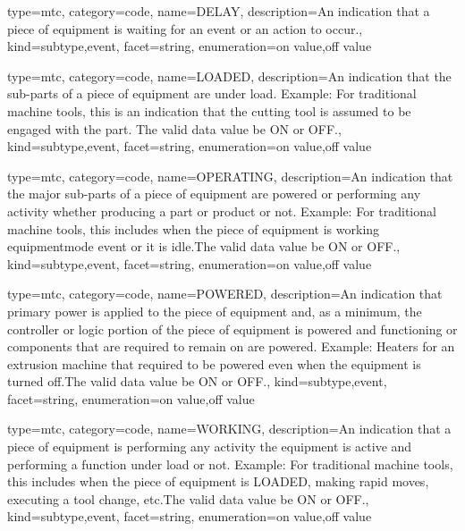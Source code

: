 {
  type=mtc,
  category=code,
  name={DELAY},
  description={An indication that a piece of equipment is waiting for an event or an action to occur.},
  kind={subtype,event},
  facet={\gls{string}},
  enumeration={\gls{on value},\gls{off value}}
}


{
  type=mtc,
  category=code,
  name={LOADED},
  description={An indication that the sub-parts of a piece of equipment are under load. \newline Example: For traditional machine tools, this is an indication that the cutting tool is assumed to be engaged with the part. The \gls{valid data value} \must be ON or OFF.},
  kind={subtype,event},
  facet={\gls{string}},
  enumeration={\gls{on value},\gls{off value}}
}


{
  type=mtc,
  category=code,
  name={OPERATING},
  description={An indication that the major sub-parts of a piece of equipment are powered or performing any activity whether producing a part or product or not.   \newline Example: For traditional machine tools, this includes when the piece of equipment is \gls{working equipmentmode event} or it is idle.The \gls{valid data value} \must be ON or OFF.},
  kind={subtype,event},
  facet={\gls{string}},
  enumeration={\gls{on value},\gls{off value}}
}


{
  type=mtc,
  category=code,
  name={POWERED},
  description={An indication that primary power is applied to the piece of equipment and, as a minimum, the controller or logic portion of the piece of equipment is powered and functioning or components that are required to remain on are powered. Example: Heaters for an extrusion machine that required to be powered even when the equipment is turned off.The \gls{valid data value} \must be ON or OFF.},
  kind={subtype,event},
  facet={\gls{string}},
  enumeration={\gls{on value},\gls{off value}}
}


{
  type=mtc,
  category=code,
  name={WORKING},
  description={An indication that a piece of equipment is performing any activity  the equipment is active and performing a function under load or not. \newline Example: For traditional machine tools, this includes when the piece of equipment is LOADED, making rapid moves, executing a tool change, etc.The \gls{valid data value} \must be ON or OFF.},
  kind={subtype,event},
  facet={\gls{string}},
  enumeration={\gls{on value},\gls{off value}}
}


